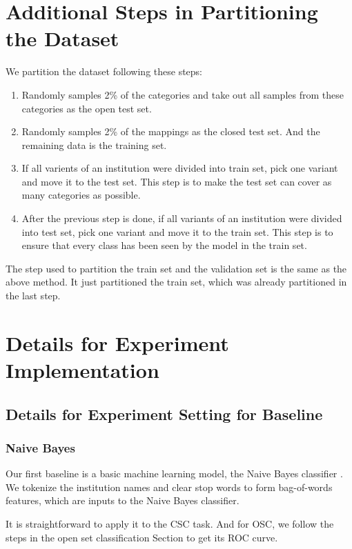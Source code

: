 \documentclass{article}
\begin{document}
\section{Additional Steps in Partitioning the Dataset} \label{appendix_sampling}
We partition the dataset following these steps:
\begin{enumerate}
    \item Randomly samples 2\% of the categories and take out all samples from these categories as the open test set.
    \item Randomly samples 2\% of the mappings as the closed test set. And the remaining data is the training set.
    \item If all varients of an institution were divided into train set, pick one variant and move it to the test set. This step is to make the test set can cover as many categories as possible.
    \item After the previous step is done, if all variants of an institution were divided into test set, pick one variant and move it to the train set. This step is to ensure that every class has been seen by the model in the train set.
\end{enumerate}
The step used to partition the train set and the validation set is the same as the above method. It just partitioned the train set, which was already partitioned in the last step.


\section{Details for Experiment Implementation}
\label{bertdetail}

\subsection{Details for Experiment Setting for Baseline}
\subsubsection{Naive Bayes}
\label{nb}
Our first baseline is a basic machine learning model, the Naive Bayes classifier \cite{maron1961automatic}. We tokenize the institution names and clear stop words to form bag-of-words features, which are inputs to the Naive Bayes classifier.

It is straightforward to apply it to the CSC task. And for OSC, we follow the steps in the open set classification Section to get its ROC curve. 
\end{document}
